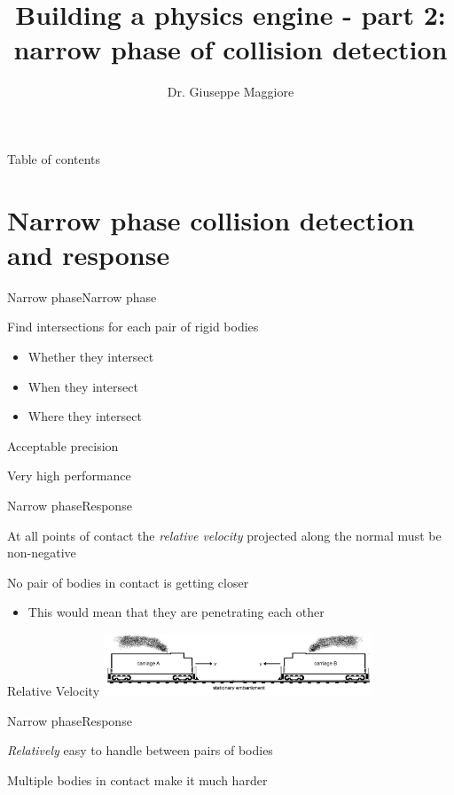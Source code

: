 \documentclass{beamer}
\title{Building a physics engine - part 2: narrow phase of collision detection}
\author{Dr. Giuseppe Maggiore}
\institute{NHTV University of Applied Sciences \\ 
Breda, Netherlands}
\date{}
\begin{document}
\maketitle

\begin{frame}{Table of contents}
\tableofcontents
\end{frame}

\section{Narrow phase collision detection and response}
\begin{slide}{Narrow phase}{Narrow phase}{
\item Find intersections for each pair of rigid bodies
\begin{itemize}
\item Whether they intersect
\item When they intersect
\item Where they intersect
\end{itemize}
\item Acceptable precision
\item Very high performance
}\end{slide}

\begin{slide}{Narrow phase}{Response}{
\item At all points of contact the \textit{relative velocity} projected along the normal must be non-negative
\item No pair of bodies in contact is getting closer
\begin{itemize}
\item This would mean that they are penetrating each other
\end{itemize}
}\end{slide}

\begin{frame}{Relative Velocity}
\center
\includegraphics[width=8cm]{Pics/Rel_Vel.png}
\end{frame}

\begin{slide}{Narrow phase}{Response}{
\item \textit{Relatively} easy to handle between pairs of bodies
\item Multiple bodies in contact make it much harder
}\end{slide}
\end{document}
